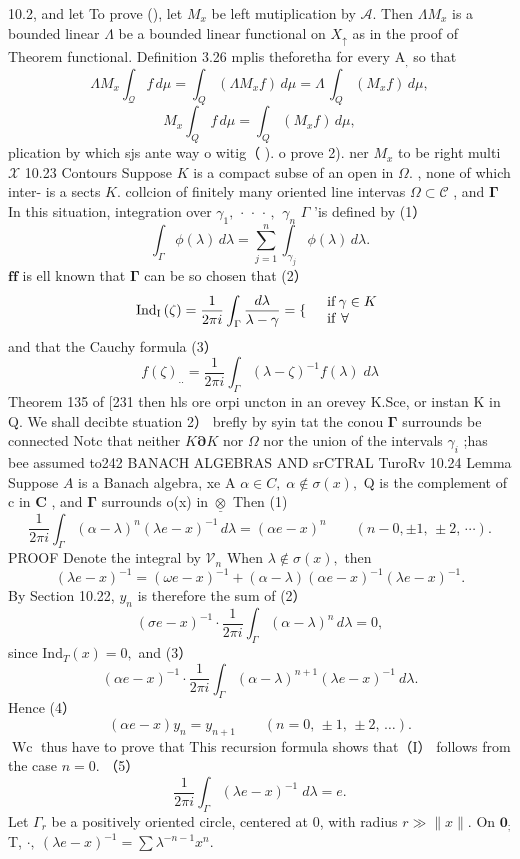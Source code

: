 10.2, and let To prove (), let $\scriptstyle M_{x}$ be left mutiplication by ${\mathcal{A}}.$ Then $\Lambda M_{x}$ is a bounded linear $\Lambda$ be a bounded linear functional on $X_{\uparrow}$ as in the proof of Theorem functional. Definition 3.26 mplis theforetha for every $\mathrm{A}_{\mathrm{{,}}}$ so that $$ \Lambda M_{x}\int_{\mathcal{Q}}f\,d\mu=\int_{Q}(\Lambda M_{x}f)\,d\mu=\Lambda\,\int_{Q}(M_{x}f)\,d\mu, $$ $$ M_{x}\int_{Q}f\,d\mu=\int_{Q}(M_{x}f)\,d\mu, $$ plication by which sjs ante way o witig（ ). o prove 2). ner $M_{x}$ to be right multi $\textstyle{\mathcal{X}}$ 10.23 Contours Suppose $\textstyle K$ is a compact subse of an open in $\Omega.$ , none of which inter- is a sects $K.$ collcion of finitely many oriented line intervas $\Omega\subset{\mathcal{C}}$ , and ${\boldsymbol{\Gamma}}$ In this situation, integration over $\gamma_{1},\,\cdot\,\cdot\,\cdot\,,\,\ \gamma_{n}$ $\Gamma$ 'is defined by (1） $$ \int_{\Gamma}\phi(\lambda)\,d\lambda=\sum_{j=1}^{n}\int_{\gamma_{j}}\phi(\lambda)\,d\lambda. $$ $\mathbf{f}\mathbf{f}$ is ell known that ${\boldsymbol{\Gamma}}$ can be so chosen that (2） $$ {\mathrm{Ind_{I}}}\left({\mathord{\zeta}}\right)={\frac{1}{2\pi i}}\int_{\Gamma}{\frac{d\lambda}{\lambda-\gamma}}= \lbrace{\begin{array}{l l}{{}}&{{\mathrm{if\,}}\gamma\in K}\\ {{}}&{{\mathrm{if\,}\,\forall\,}}\end{array}} $$ and that the Cauchy formula (3） $$ f(\zeta)_{..}{=}\frac{1}{2\pi i}\int_{\Gamma}(\lambda-\zeta)^{-1}f(\lambda)\;d\lambda $$ Theorem 135 of [231 then hls ore orpi uncton in an orevey K.Sce, or instan K in Q. We shall decibte stuation 2） brefly by syin tat the conou ${\boldsymbol{\Gamma}}$ surrounds be connected Notc that neither $K\mathbf{\partial}K$ nor $\Omega$ nor the union of the intervals $\gamma_{i}$ ;has bee assumed to242 BANACH ALGEBRAS AND srCTRAL TuroRv 10.24 Lemma Suppose $\scriptstyle A$ is a Banach algebra, xe A $\alpha\in C,\;\alpha\not\in\sigma(x),$ Q is the complement of c in ${\boldsymbol{C}}$ , and ${\boldsymbol{\Gamma}}$ surrounds o(x) in $\underline{{\otimes}}$ Then (1) $$ {\frac{1}{2\pi i}}\int_{\Gamma}(\alpha-\lambda)^{n}(\lambda e-x)^{-1}\,d\lambda=(\alpha e-x)^{n}\qquad(n-0,\pm1,\,\pm2,\,\cdots). $$ PROOF Denote the integral by ${\mathcal{V}}_{n}$ When $\lambda\notin\sigma(x),$ then $$ (\lambda e-x)^{-1}=(\omega e-x)^{-1}+(\alpha-\lambda)(\alpha e-x)^{-1}(\lambda e-x)^{-1}. $$ By Section 10.22, ${\mathbf{}}y_{n}$ is therefore the sum of (2） $$ (\sigma e-x)^{-1}\cdot\frac{1}{2\pi i}\int_{\Gamma}(\alpha-\lambda)^{n}\,d\lambda=0, $$ since ${\mathrm{Ind}}_{T}\left(x\right)=0,$ and (3） $$ (\alpha e-x)^{-1}\cdot{\frac{1}{2\pi i}}\int_{\Gamma}(\alpha-\lambda)^{n+1}(\lambda e-x)^{-1}~d\lambda. $$ Hence (4） $$ (\alpha e-x)y_{n}=y_{n+1}\qquad(n=0,\,\pm1,\,\pm2,\,\ldots). $$ $\operatorname{Wc}$ thus have to prove that This recursion formula shows that（I） follows from the case $n=0.$ （5） $$ \frac{1}{2\pi i}\int_{\Gamma}(\lambda e-x)^{-1}\;d\lambda=e. $$ Let $\textstyle\Gamma_{r}$ be a positively oriented circle, centered at 0, with radius $r\gg\|x\|.$ On $\mathbf{0}_{;}$ T, $\cdot,\ \left(\lambda e-x\right)^{-1}=\sum\lambda^{-n-1}x^{n}.$ 